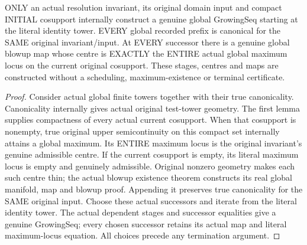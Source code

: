 \begin{theorem}
\label{hir:original-compact-cosupport-actual-global-canonical-sequence}
\leanok
ONLY an actual resolution invariant, its original domain input and compact
INITIAL cosupport internally construct a genuine global GrowingSeq starting
at the literal identity tower. EVERY global recorded prefix is canonical for
the SAME original invariant/input. At EVERY successor there is a genuine
global blowup map whose centre is EXACTLY the ENTIRE actual global maximum
locus on the current original cosupport. These stages, centres and maps are
constructed without a scheduling, maximum-existence or terminal certificate.
\end{theorem}
\begin{proof}
Consider actual global finite towers together with their true canonicality.
Canonicality internally gives actual original test-tower geometry. The first
lemma supplies compactness of every actual current cosupport. When that
cosupport is nonempty, true original upper semicontinuity on this compact
set internally attains a global maximum. Its ENTIRE maximum locus is the
original invariant's genuine admissible centre. If the current cosupport
is empty, its literal maximum locus is empty and genuinely admissible.
Original nonzero geometry makes each such centre thin; the actual blowup
existence theorem constructs its real global manifold, map and blowup proof.
Appending it preserves true canonicality for the SAME original input.
Choose these actual successors and iterate from the literal identity tower.
The actual dependent stages and successor equalities give a genuine
GrowingSeq; every chosen successor retains its actual map and literal
maximum-locus equation. All choices precede any termination argument.
\end{proof}

